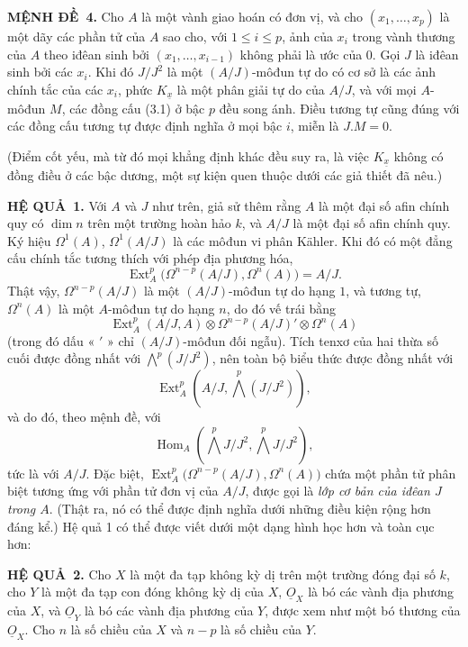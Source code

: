 \documentclass[11pt,twoside,openany]{book}
\numberwithin{equation}{section}
\newcommand{\src}[1]{%
  \phantomsection\hypertarget{src:\fgasourceid:#1}{}%
  \marginpar{\raggedleft\footnotesize\sffamily #1}%
}
\newcommand{\fgasourceid}{unset}
\newcommand{\Osh}{\underline{O}}
\newcommand{\result}[2]{\par\medskip\noindent\textbf{#1\if\relax\detokenize{#2}\relax\else\ #2\fi.}\quad}
\begin{document}
\src{175}
\result{MỆNH ĐỀ}{4} Cho $A$ là một vành giao hoán có đơn vị, và cho
$(x_1,\ldots,x_p)$ là một dãy các phần tử của $A$ sao cho, với $1\leq i\leq p$,
ảnh của $x_i$ trong vành thương của $A$ theo iđêan sinh bởi
$(x_1,\ldots,x_{i-1})$ không phải là ước của $0$. Gọi $J$ là iđêan sinh
bởi các $x_i$. Khi đó $J/J^{2}$ là một $(A/J)$-môđun tự do có cơ sở là các
ảnh chính tắc của các $x_i$, phức $K_{\underline{x}}$ là một
phân giải tự do của $A/J$, và với mọi $A$-môđun $M$, các đồng cấu (3.1) ở
bậc $p$ đều song ánh. Điều tương tự cũng đúng với các đồng cấu tương tự
được định nghĩa ở mọi bậc $i$, miễn là $J.M=0$.

(Điểm cốt yếu, mà từ đó mọi khẳng định khác đều suy ra, là việc
$K_{\underline{x}}$ không có đồng điều ở các bậc dương, một sự kiện quen thuộc dưới các giả thiết đã nêu.)

\result{HỆ QUẢ}{1} Với $A$ và $J$ như trên, giả sử thêm rằng
$A$ là một đại số afin chính quy có $\dim n$ trên một trường hoàn hảo $k$, và
$A/J$ là một đại số afin chính quy. Ký hiệu $\Omega^{1}(A)$,
$\Omega^{1}(A/J)$ là các môđun vi phân Kähler. Khi đó có một
đẳng cấu chính tắc tương thích với phép địa phương hóa,
\begin{equation}\tag{3.5}
  \operatorname{Ext}_{A}^{p}\bigl(\Omega^{n-p}(A/J),\Omega^{n}(A)\bigr)=A/J.
\end{equation}
Thật vậy, $\Omega^{n-p}(A/J)$ là một $(A/J)$-môđun tự do hạng $1$, và tương tự,
$\Omega^{n}(A)$ là một $A$-môđun tự do hạng $n$,
do đó vế trái bằng
\[
  \operatorname{Ext}_{A}^{p}(A/J,A)
  \otimes\Omega^{n-p}(A/J)'\otimes\Omega^{n}(A)
\]
(trong đó dấu « $'$ » chỉ $(A/J)$-môđun đối ngẫu). Tích tenxơ của
hai thừa số cuối được đồng nhất với $\bigwedge^{p}(J/J^{2})$,
nên toàn bộ biểu thức
được đồng nhất với
\[
  \operatorname{Ext}_{A}^{p}\!\left(A/J,\bigwedge^{p}(J/J^{2})\right),
\]
và do đó, theo mệnh đề, với
\[
  \operatorname{Hom}_{A}\!\left(\bigwedge^{p}J/J^{2},
  \bigwedge^{p}J/J^{2}\right),
\]
tức là với $A/J$. Đặc biệt,
$\operatorname{Ext}_{A}^{p}\bigl(\Omega^{n-p}(A/J),\Omega^{n}(A)\bigr)$ chứa
một phần tử phân biệt tương ứng với phần tử đơn vị của $A/J$, được gọi là
\emph{lớp cơ bản của iđêan $J$ trong $A$}. (Thật ra, nó có thể được
định nghĩa dưới những điều kiện rộng hơn đáng kể.) Hệ quả 1 có thể được viết
dưới một dạng hình học hơn và toàn cục hơn:

\result{HỆ QUẢ}{2} Cho $X$ là một đa tạp không kỳ dị trên một trường đóng
đại số $k$, cho $Y$ là một đa tạp con đóng không kỳ dị của $X$,
$\Osh_X$ là bó các vành địa phương của $X$, và $\Osh_Y$ là bó các vành
địa phương của $Y$, được xem như một bó thương của $\Osh_X$. Cho $n$ là
số chiều của $X$ và $n-p$ là số chiều của $Y$.
\end{document}

